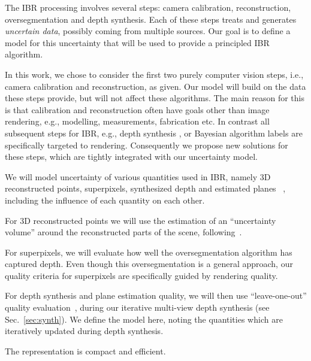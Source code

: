 The IBR processing involves several steps: camera calibration, reconstruction, oversegmentation 
and depth synthesis. 
Each of these steps treats and generates \emph{uncertain data}, possibly coming from multiple sources.
Our goal is to define a model for this uncertainty that will be used to provide a principled
IBR algorithm.

In this work, we chose to consider the first two purely computer vision steps,
i.e., camera calibration and reconstruction, as given. Our model will build on the
data these steps provide, but will not affect these algorithms. The main reason
for this is that calibration and reconstruction often have goals other than image
rendering, e.g., modelling, measurements, fabrication etc. In contrast all subsequent
steps for IBR, e.g., depth synthesis \cite{chaurasia13}, or Bayesian algorithm
labels \cite{ODD15} are specifically targeted to rendering. Consequently
we propose new solutions for these steps, which are tightly integrated with
our uncertainty model.

We will model uncertainty of various quantities used in IBR, namely 3D reconstructed points,
superpixels\cite{slic12}, synthesized depth \cite{chaurasia13} and estimated planes ~\cite{ODD15},
including the influence of each quantity on each other.
\begin{comment}
Or a abstract model that includes the effect of all uncertainties. 
\end{comment}

For 3D reconstructed points we will use the estimation of an ``uncertainty volume''
around the reconstructed parts of the scene, following~\cite{devernay}.

For superpixels, we will evaluate how well the oversegmentation algorithm has captured
depth. Even though this oversegmentation is a general approach, our quality criteria
for superpixels are specifically guided by rendering quality. 
 
For depth synthesis and plane estimation quality, we will then use ``leave-one-out'' 
quality evaluation~\cite{ODD15}, during
our iterative multi-view depth synthesis (see Sec.~\ref{sec:synth}).
We define the model here, noting the quantities which are iteratively
updated during depth synthesis. 

The representation is compact and efficient. 


